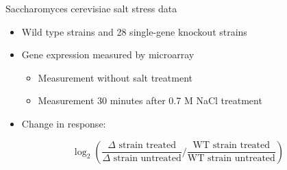 \documentclass[aspectratio=169]{beamer}
\begin{document}
\begin{frame}{Saccharomyces cerevisiae salt stress data}
\begin{itemize}
 \item Wild type strains and 28 single-gene knockout strains
 \item Gene expression measured by microarray
  \begin{itemize}
   \item \normalsize Measurement without salt treatment
   \item \normalsize Measurement 30 minutes after 0.7 M NaCl treatment
  \end{itemize}
 \item Change in response:
\end{itemize}
\[
 \log_2 \left( \frac{\Delta \text{ strain treated}}{\Delta \text{ strain untreated}} \bigg/ \frac{\text{WT strain treated}}{\text{WT strain untreated}} \right)
\]
\vfill
{\parencite{berry2008stress, lee2011dynamic} \\}
\end{frame}

\end{document}
